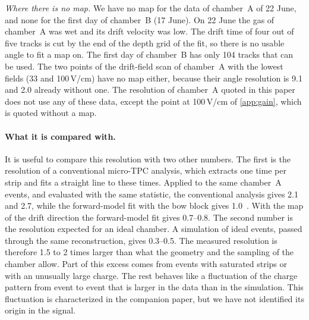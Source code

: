 \emph{Where there is no map.} We have no map for the data of chamber~A of 22 June, and none for the first day of
chamber~B (17 June). On 22 June the gas of chamber~A was wet and its drift velocity was low. The drift time of
four out of five tracks is cut by the end of the depth grid of the fit, so there is no usable angle to fit a map on.
The first day of chamber~B has only 104 tracks that can be used. The two points
of the drift-field scan of chamber~A with the lowest fields (33 and 100\,V/cm) have no map either, because their
angle resolution is 9.1 and 2.0\textdegree{} already without one. The resolution of chamber~A quoted in this paper
does not use any of these data, except the point at 100\,V/cm of \cref{app:gain}, which is quoted without a map.

\paragraph{What it is compared with.} It is useful to compare this resolution with two other numbers. The first is
the resolution of a conventional micro-TPC analysis, which extracts one time per strip and fits a straight line to
these times. Applied to the same chamber~A events, and evaluated with the same statistic, the conventional analysis
gives 2.1\textdegree{} and 2.7\textdegree, while the forward-model fit with the bow block gives 1.0\textdegree~\cite{paperII}.
With the map of the drift direction the forward-model fit gives 0.7--0.8\textdegree. The second number is
the resolution expected for an ideal chamber. A simulation of ideal events, passed through the same reconstruction,
gives 0.3--0.5\textdegree. The measured resolution is therefore 1.5 to 2 times larger than what the geometry
and the sampling of the chamber allow. Part of this excess comes from events with saturated strips or with an
unusually large charge. The rest behaves like a fluctuation of the charge pattern from event to event that is larger
in the data than in the simulation. This fluctuation is characterized in the companion paper, but we have not
identified its origin in the signal.

